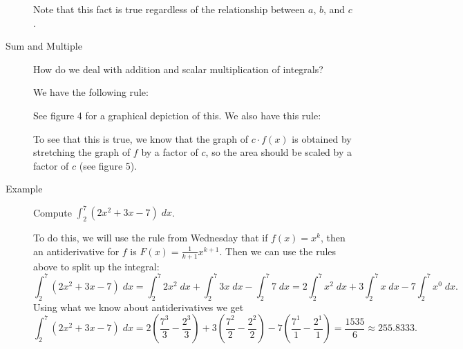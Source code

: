 \documentclass[11pt]{article}
\begin{document}
\begin{description}
  Note that this fact is true regardless of the relationship between
  $a$, $b$, and $c$.
\item[Sum and Multiple] How do we deal with addition and scalar
  multiplication of integrals?

  We have the following rule:
  \begin{center}
  \end{center}
  See figure 4 for a graphical depiction of this.  We also have this rule:
  \begin{center}
  \end{center}
  To see that this is true, we know that the graph of $c\cdot f(x)$ is
  obtained by stretching the graph of $f$ by a factor of $c$, so the
  area should be scaled by a factor of $c$ (see figure 5).
  
\item[Example] Compute $\int_2^7 (2x^2+3x-7)\;dx$.

  To do this, we will use the rule from Wednesday that if $f(x) =
  x^k$, then an antiderivative for $f$ is $F(x)=\frac{1}{k+1}x^{k+1}$.
  Then we can use the rules above to split up the integral:
  \[
  \int_2^7 (2x^2+3x-7)\;dx =
  \int_2^7 2x^2\; dx +\int_2^7 3x\; dx - \int_2^7 7\; dx = 
  2\int_2^7 x^2\; dx +3\int_2^7 x\; dx - 7\int_2^7 x^0\; dx.
  \]
  Using what we know about antiderivatives we get
  \[
  \int_2^7 (2x^2+3x-7)\;dx
  = 2\left(\frac{7^3}{3}-\frac{2^3}{3}\right) +
  3\left(\frac{7^2}{2}-\frac{2^2}{2}\right) -
  7\left(\frac{7^1}{1}-\frac{2^1}{1}\right)
  = \frac{1535}{6} \approx 255.8333.
  \]
  
\end{description}
\end{document}
